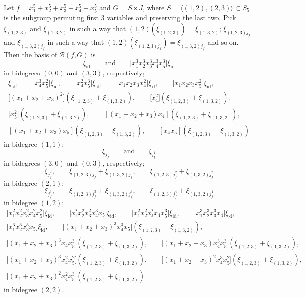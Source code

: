\documentclass[10pt,a4paper]{article}
\numberwithin{equation}{section}
\newcommand{\id}{\mathrm{id}}
\def\B{{\mathcal B}}
\begin{document}
\begin{Example}
Let $f=x_1^5+x_2^5+x_3^5+x_4^5+x_5^5$ and $G=S\ltimes J$, where $S=\langle (1,2), (2,3)\rangle\subset S_5$ is the subgroup permuting first 3 variables and preserving the last two. Pick $\xi_{(1,2,3)}$ and $\xi_{(1,3,2)}$ in such a way that $(1,2)(\xi_{(1,2,3)})=\xi_{(1,3,2)}$; $\xi_{(1,2,3)j_f}$ and $\xi_{(1,3,2)j_f}$ in such a way that $(1,2)(\xi_{(1,2,3)j_f})=\xi_{(1,3,2)j_f}$ and so on. Then the basis of $\B(f,G)$ is
\[
\xi_{\id} \qquad \text{and} \qquad \bigl[x_1^3x_2^3x_3^3x_4^3x_5^3\bigr]\xi_{\id}
\]
in bidegrees $(0,0)$ and $(3,3)$, respectively;
\begin{gather*}
[x_1x_2x_3x_4x_5]\xi_{\id},\qquad\bigl[x_4^3x_5^2\bigr]\xi_{\id},\qquad\bigl[x_4^2x_5^3\bigr]\xi_{\id}, \qquad\bigl[x_1x_2x_3x_4^2\bigr]\xi_{\id},\qquad \bigl[x_1x_2x_3x_5^2\bigr]\xi_{\id},\\
\bigl[(x_1+x_2+x_3)^2\bigr](\xi_{(1,2,3)}+\xi_{(1,3,2)}),\qquad
\bigl[x_4^2\bigr](\xi_{(1,2,3)}+\xi_{(1,3,2)}),\\ \bigl[x_5^2\bigr](\xi_{(1,2,3)}+\xi_{(1,3,2)}),\qquad
[(x_1+x_2+x_3)x_4](\xi_{(1,2,3)}+\xi_{(1,3,2)}),\\ [(x_1+x_2+x_3)x_5](\xi_{(1,2,3)}+\xi_{(1,3,2)}),\qquad [x_4x_5](\xi_{(1,2,3)}+\xi_{(1,3,2)})
\end{gather*}
in bidegree $(1,1)$;
\[
\xi_{j_f} \qquad \text{and} \qquad \xi_{j_f^4}
\]
in bidegrees $(3,0)$ and $(0,3)$, respectively;
\[
\xi_{j_f^2}, \qquad \xi_{(1,2,3)j_f}+\xi_{(1,3,2)j_f}, \qquad \xi_{(1,2,3)j_f^2}+\xi_{(1,3,2)j_f^2}
\]
in bidegree $(2,1)$;
\[
\xi_{j_f^3}, \qquad \xi_{(1,2,3)j_f^3}+\xi_{(1,3,2)j_f^3}, \qquad \xi_{(1,2,3)j_f^4}+\xi_{(1,3,2)j_f^4}
\]
in bidegree $(1,2)$;
\begin{gather*}
\bigl[x_1^2x_2^2x_3^2x_4^2x_5^2\bigr]\xi_{\id},\qquad \bigl[x_1^2x_2^2x_3^2x_4^3x_5\bigr]\xi_{\id},\qquad\bigl[x_1^2x_2^2x_3^2x_4x_5^3\bigr]\xi_{\id}, \qquad\bigl[x_1^3x_2^3x_3^3x_4\bigr]\xi_{\id},\\
\bigl[x_1^3x_2^3x_3^3x_5\bigr]\xi_{\id},\qquad
\bigl[(x_1+x_2+x_3)^3x_4^3x_5\bigr](\xi_{(1,2,3)}+\xi_{(1,3,2)}),\\
\bigl[(x_1+x_2+x_3)^3x_4x_5^3\bigr](\xi_{(1,2,3)}+\xi_{(1,3,2)}),\qquad
\bigl[(x_1+x_2+x_3)x_4^3x_5^3\bigr](\xi_{(1,2,3)}+\xi_{(1,3,2)}),\\
\bigl[(x_1+x_2+x_3)^3x_4^2x_5^2\bigr](\xi_{(1,2,3)}+\xi_{(1,3,2)}),\qquad \bigl[(x_1+x_2+x_3)^2x_4^3x_5^2\bigr](\xi_{(1,2,3)}+\xi_{(1,3,2)}),\\ \bigl[(x_1+x_2+x_3)^2x_4^2x_5^3\bigr](\xi_{(1,2,3)}+\xi_{(1,3,2)})
\end{gather*}
in bidegree $(2,2)$.


\end{Example}
\end{document}
